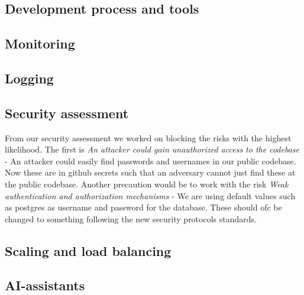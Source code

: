 \subsection{Development process and tools}



\subsection{Monitoring}

\subsection{Logging}

\subsection{Security assessment}
From our security assessment we worked on blocking the risks with the highest likelihood. The first is \textit{An attacker could gain unauthorized access to the codebase}
- An attacker could easily find passwords and usernames in our public codebase. Now these are in github secrets such that an adversary cannot just 
find these at the public codebase. Another precaution would be to work with the risk \textit{Weak authentication and authorization mechanisms}
 - We are using default values such as postgres as username and password for the database. These should ofc be changed to something following the
 new security protocols standards. 

 \subsection{Scaling and load balancing}

 \subsection{AI-assistants}